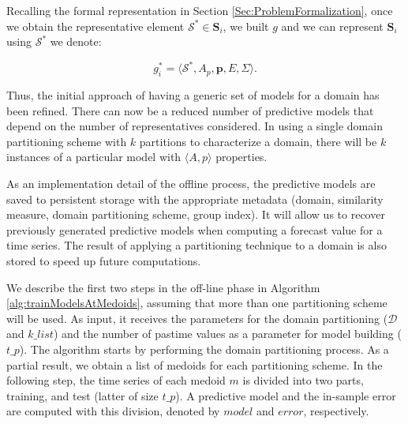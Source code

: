 Recalling the formal representation in Section \ref{Sec:ProblemFormalization}, once we obtain the representative element $\mathcal{S}^{*} \in \mathbf{S}_{i}$, we built $g$ and we can represent $\mathbf{S}_{i}$ using $\mathcal{S}^{*}$ we denote:

\begin{equation}
g^{*}_{i} = \langle \mathcal{S}^{*}, A_p, \mathbf{p}, E, \varSigma \rangle.
\end{equation}

Thus, the initial approach of having a generic set of models for a domain has been refined. There can now be a reduced number of predictive models that depend on the number of representatives considered. In using a single domain partitioning scheme with $k$ partitions to characterize a domain, there will be $k$ instances of a particular model with $\langle A, p \rangle$ properties. 

As an implementation detail of the offline process, the predictive models are saved to persistent storage with the appropriate metadata (domain, similarity measure, domain partitioning scheme, group index). It will allow us to recover previously generated predictive models when computing a forecast value for a time series. The result of applying a partitioning technique to a domain is also stored to speed up future computations.

We describe the first two steps in the off-line phase in Algorithm \ref{alg:trainModelsAtMedoids}, assuming that more than one partitioning scheme will be used. As input, it receives the parameters for the domain partitioning ($\mathcal{D}$ and $k\_list$) and the number of pastime values as a parameter for model building ($t\_p$). The algorithm starts by performing the domain partitioning process. As a partial result, we obtain a list of medoids for each partitioning scheme. In the following step, the time series of each medoid $m$ is divided into two parts, training, and test (latter of size $t\_p$). A predictive model and the in-sample error are computed with this division, denoted by $model$ and $error$, respectively.

